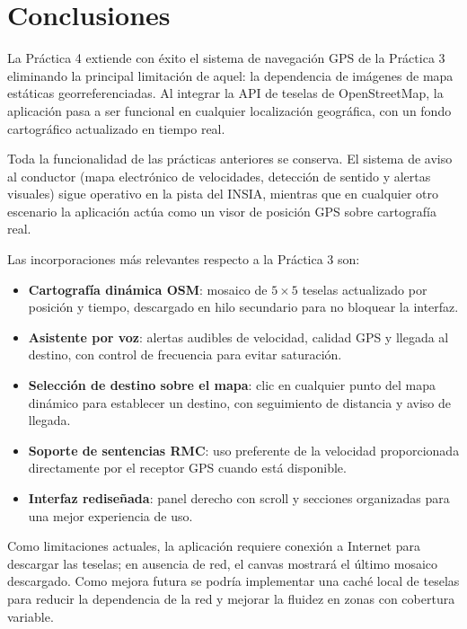 \documentclass[10pt]{article}
\begin{document}
\section{Conclusiones}

La Práctica 4 extiende con éxito el sistema de navegación GPS de la Práctica 3 eliminando la principal limitación de aquel: la dependencia de imágenes de mapa estáticas georreferenciadas. Al integrar la API de teselas de OpenStreetMap, la aplicación pasa a ser funcional en cualquier localización geográfica, con un fondo cartográfico actualizado en tiempo real.

Toda la funcionalidad de las prácticas anteriores se conserva. El sistema de aviso al conductor (mapa electrónico de velocidades, detección de sentido y alertas visuales) sigue operativo en la pista del INSIA, mientras que en cualquier otro escenario la aplicación actúa como un visor de posición GPS sobre cartografía real.

Las incorporaciones más relevantes respecto a la Práctica 3 son:

\begin{itemize}[leftmargin=1.2em]
    \item \textbf{Cartografía dinámica OSM}: mosaico de $5 \times 5$ teselas actualizado por posición y tiempo, descargado en hilo secundario para no bloquear la interfaz.
    \item \textbf{Asistente por voz}: alertas audibles de velocidad, calidad GPS y llegada al destino, con control de frecuencia para evitar saturación.
    \item \textbf{Selección de destino sobre el mapa}: clic en cualquier punto del mapa dinámico para establecer un destino, con seguimiento de distancia y aviso de llegada.
    \item \textbf{Soporte de sentencias RMC}: uso preferente de la velocidad proporcionada directamente por el receptor GPS cuando está disponible.
    \item \textbf{Interfaz rediseñada}: panel derecho con scroll y secciones organizadas para una mejor experiencia de uso.
\end{itemize}

Como limitaciones actuales, la aplicación requiere conexión a Internet para descargar las teselas; en ausencia de red, el canvas mostrará el último mosaico descargado. Como mejora futura se podría implementar una caché local de teselas para reducir la dependencia de la red y mejorar la fluidez en zonas con cobertura variable.
\end{document}
